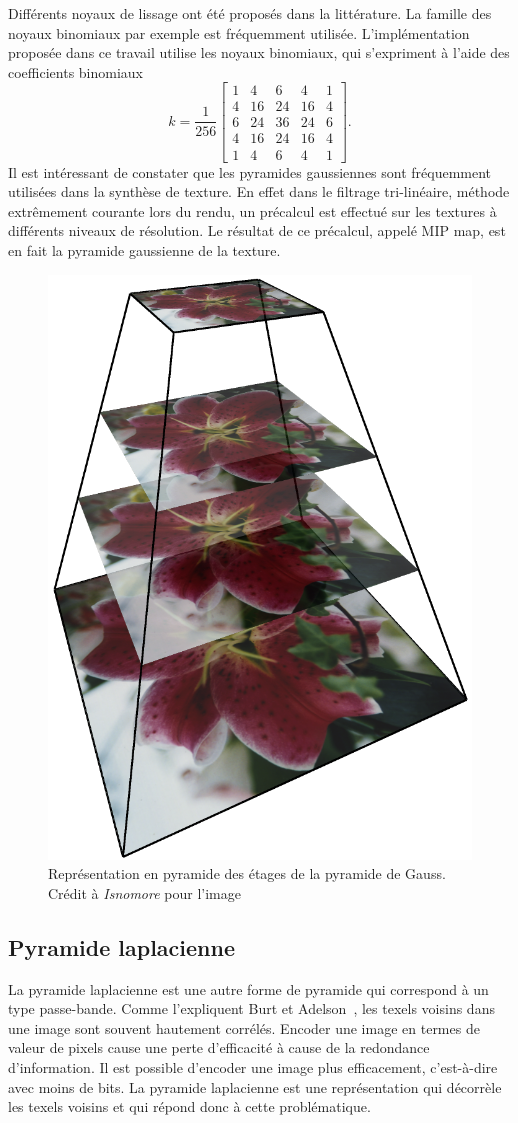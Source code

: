 Différents noyaux de lissage ont été proposés dans la littérature. La famille des noyaux binomiaux par exemple est fréquemment utilisée. L'implémentation proposée dans ce travail utilise les noyaux binomiaux, qui s'expriment à l'aide des coefficients binomiaux
\begin{equation}
    k = \frac{1}{256}\left[
        \begin{array}{ccccccc}
            1 & 4 & 6 & 4 & 1 \\
            4 & 16 & 24 & 16 & 4 \\
            6 & 24 & 36 & 24 & 6 \\
            4 & 16 & 24 & 16 & 4 \\
            1 & 4 & 6 & 4 & 1
        \end{array}
    \right].
\end{equation}
Il est intéressant de constater que les pyramides gaussiennes sont fréquemment utilisées dans la synthèse de texture. En effet dans le filtrage tri-linéaire, méthode extrêmement courante lors du rendu, un précalcul est effectué sur les textures à différents niveaux de résolution. Le résultat de ce précalcul, appelé MIP map, est en fait la pyramide gaussienne de la texture.

\begin{figure}
    \centering
    \includegraphics[width=.25\textwidth]{contenu/resources/images/image_pyramid_placeholder}
    \caption[Représentation pyramidale des étages de la pyramide de Gauss]{Représentation en pyramide des étages de la pyramide de Gauss. Crédit à \textit{Isnomore} pour l'image}
    \label{fig:pyramid-gauss}
\end{figure}

\subsection{Pyramide laplacienne}

La pyramide laplacienne est une autre forme de pyramide qui correspond à un type passe-bande. Comme l'expliquent Burt et Adelson~\cite{burt_laplacian_1983}, les texels voisins dans une image sont souvent hautement corrélés. Encoder une image en termes de valeur de pixels cause une perte d'efficacité à cause de la redondance d'information. Il est possible d'encoder une image plus efficacement, c'est-à-dire avec moins de bits. La pyramide laplacienne est une représentation qui décorrèle les texels voisins et qui répond donc à cette problématique.

